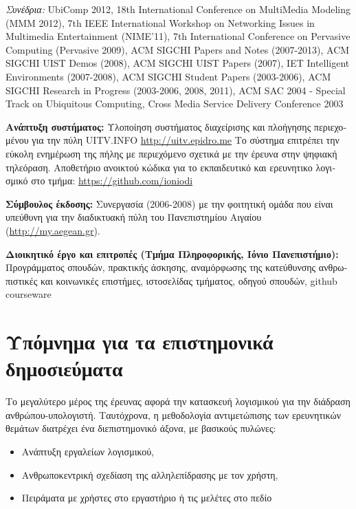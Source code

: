 \documentclass[11pt, a4paper]{article}
\begin{document}
\begin{greek}
\emph{Συνέδρια:} UbiComp 2012, 18th International Conference on
MultiMedia Modeling (MMM 2012), 7th IEEE International Workshop on
Networking Issues in Multimedia Entertainment (NIME'11), 7th
International Conference on Pervasive Computing (Pervasive 2009), ACM
SIGCHI Papers and Notes (2007-2013), ACM SIGCHI UIST Demos (2008), ACM
SIGCHI UIST Papers (2007), IEΤ Intelligent Environments (2007-2008), ACM
SIGCHI Student Papers (2003-2006), ACM SIGCHI Research in Progress
(2003-2006, 2008, 2011), ACM SAC 2004 - Special Track on Ubiquitous
Computing, Cross Media Service Delivery Conference 2003

\textbf{Ανάπτυξη συστήματος:} Υλοποίηση συστήματος διαχείρισης και
πλοήγησης περιεχομένου για την πύλη UITV.INFO
\href{http://uitv.epidro.me}{{http://uitv.epidro.me}} Το σύστημα
επιτρέπει την εύκολη ενημέρωση της πήλης με περιεχόμενο σχετικά με την
έρευνα στην ψηφιακή τηλεόραση. Αποθετήριο ανοικτού κώδικα για το
εκπαιδευτικό και ερευνητικο λογισμικό στο τμήμα:
\href{https://github.com/ioniodi}{{https://github.com/ioniodi}}

\textbf{Σύμβουλος έκδοσης:} Συνεργασία (2006-2008) με την φοιτητική
ομάδα που είναι υπεύθυνη για την διαδικτυακή πύλη του Πανεπιστημίου
Αιγαίου (\href{http://my.aegean.gr/}{{http://my.aegean.gr}}).

\textbf{Διοικητικό έργο και επιτροπές (Τμήμα Πληροφορικής, Ιόνιο
Πανεπιστήμιο):} Προγράμματος σπουδών, πρακτικής άσκησης, αναμόρφωσης της
κατεύθυνσης ανθρωπιστικές και κοινωνικές επιστήμες, ιστοσελίδας
τμήματος, οδηγού σπουδών, github courseware

\hypertarget{ux3c5ux3c0ux3ccux3bcux3bdux3b7ux3bcux3b1-ux3b3ux3b9ux3b1-ux3c4ux3b1-ux3b5ux3c0ux3b9ux3c3ux3c4ux3b7ux3bcux3bfux3bdux3b9ux3baux3ac-ux3b4ux3b7ux3bcux3bfux3c3ux3b9ux3b5ux3cdux3bcux3b1ux3c4ux3b1}{%
\section{Υπόμνημα για τα επιστημονικά
δημοσιεύματα}\label{ux3c5ux3c0ux3ccux3bcux3bdux3b7ux3bcux3b1-ux3b3ux3b9ux3b1-ux3c4ux3b1-ux3b5ux3c0ux3b9ux3c3ux3c4ux3b7ux3bcux3bfux3bdux3b9ux3baux3ac-ux3b4ux3b7ux3bcux3bfux3c3ux3b9ux3b5ux3cdux3bcux3b1ux3c4ux3b1}}

Το μεγαλύτερο μέρος της έρευνας αφορά την κατασκευή λογισμικού για την
διάδραση ανθρώπου-υπολογιστή. Ταυτόχρονα, η μεθοδολογία αντιμετώπισης
των ερευνητικών θεμάτων διατρέχει ένα διεπιστημονικό άξονα, με βασικούς
πυλώνες:

\begin{itemize}
\item
  Ανάπτυξη εργαλείων λογισμικού,
\item
  Ανθρωποκεντρική σχεδίαση της αλληλεπίδρασης με τον χρήστη,
\item
  Πειράματα με χρήστες στο εργαστήριο ή τις μελέτες στο πεδίο
\end{itemize}


\end{greek}
\end{document}
